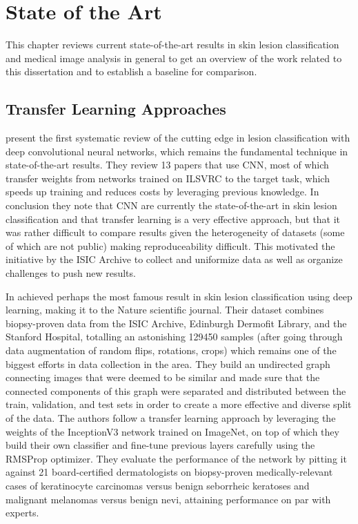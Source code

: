 \chapter{State of the Art}
\label{chapter:sota}

This chapter reviews current state-of-the-art results in skin lesion classification and medical image analysis in general to get an overview of the work related to this dissertation and to establish a baseline for comparison.

\section{Transfer Learning Approaches}

\citeauthor{Brinker2018} \cite{Brinker2018} present the first systematic review of the cutting edge in lesion classification with deep convolutional neural networks, which remains the fundamental technique in state-of-the-art results. They review 13 papers that use \ac{CNN}, most of which transfer weights from networks trained on \ac{ILSVRC} to the target task, which speeds up training and reduces costs by leveraging previous knowledge. In conclusion they note that \ac{CNN} are currently the state-of-the-art in skin lesion classification and that transfer learning is a very effective approach, but that it was rather difficult to compare results given the heterogeneity of datasets (some of which are not public) making reproduceability difficult. This motivated the initiative by the ISIC Archive to collect and uniformize data as well as organize challenges to push new results.

In \citeyear{nature2017} \citeauthor{nature2017} \cite{nature2017} achieved perhaps the most famous result in skin lesion classification using deep learning, making it to the Nature scientific journal. Their dataset combines biopsy-proven data from the ISIC Archive, Edinburgh Dermofit Library, and the Stanford Hospital, totalling an astonishing 129450 samples (after going through data augmentation of random flips, rotations, crops) which remains one of the biggest efforts in data collection in the area. They build an undirected graph connecting images that were deemed to be similar and made sure that the connected components of this graph were separated and distributed between the train, validation, and test sets in order to create a more effective and diverse split of the data. The authors follow a transfer learning approach by leveraging the weights of the InceptionV3 network trained on ImageNet, on top of which they build their own classifier and fine-tune previous layers carefully using the RMSProp optimizer. They evaluate the performance of the network by pitting it against 21 board-certified dermatologists on biopsy-proven medically-relevant cases of keratinocyte carcinomas versus benign seborrheic keratoses and malignant melanomas versus benign nevi, attaining performance on par with experts.

